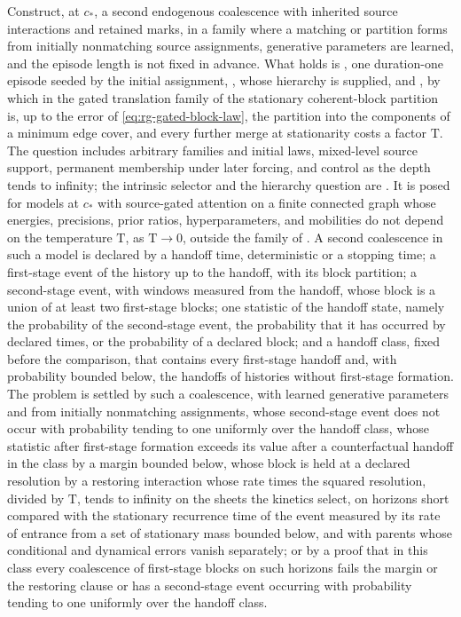Construct, at \(c_*\), a second endogenous coalescence with inherited source
interactions and retained marks, in a family where a matching or partition
forms from initially nonmatching source assignments, generative parameters are
learned, and the episode length is not fixed in advance. What holds is
, one duration-one episode seeded by
the initial assignment, , whose
hierarchy is supplied, and , by which in the
gated translation family of  the
stationary coherent-block partition is, up to the error of
\cref{eq:rg-gated-block-law}, the partition into the components of a minimum
edge cover, and every further merge at stationarity costs a factor
\(\mathrm T\). The question includes arbitrary families and initial
laws, mixed-level source support, permanent membership under later forcing,
and control as the depth tends to infinity; the intrinsic selector and the
hierarchy question are
. It is posed for
models at \(c_*\) with source-gated attention on a finite connected graph
whose energies, precisions, prior ratios, hyperparameters, and mobilities do
not depend on the temperature \(\mathrm T\), as \(\mathrm T\to0\), outside the
family of . A second coalescence in
such a model is declared by a handoff time, deterministic or a stopping time;
a first-stage event of the history up to the handoff, with its block
partition; a second-stage event, with windows measured from the handoff,
whose block is a union of at least two first-stage blocks; one statistic of
the handoff state, namely the probability of the second-stage event, the
probability that it has occurred by declared times, or the probability of a
declared block; and a handoff class, fixed before the comparison, that
contains every first-stage handoff and, with probability bounded below, the
handoffs of histories without first-stage formation. The problem is settled
by such a coalescence, with learned generative parameters and from initially
nonmatching assignments, whose second-stage event does not occur with
probability tending to one uniformly over the handoff class, whose statistic
after first-stage formation exceeds its value after a counterfactual handoff
in the class by a margin bounded below, whose block is held at a declared
resolution by a restoring interaction whose rate times the squared
resolution, divided by \(\mathrm T\), tends to infinity on the sheets the
kinetics select, on horizons short compared with the stationary recurrence
time of the event measured by its rate of entrance from a set of stationary
mass bounded below, and with parents whose conditional and dynamical errors
vanish separately; or by a proof that in this class every coalescence of
first-stage blocks on such horizons fails the margin or the restoring
clause or has a second-stage event occurring with probability tending to one
uniformly over the handoff class.

